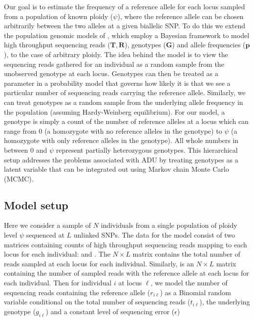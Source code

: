 \documentclass[11pt,english,letterpaper,oneside]{article}
\begin{document}
\noindent Our goal is to estimate the frequency of a reference allele for each locus sampled from a population of known ploidy ($\psi$), where the reference allele can be chosen arbitrarily between the two alleles at a given biallelic SNP. To do this we extend the population genomic models of \cite{buerkle2013popModels}, which employ a Bayesian framework to model high throughput sequencing reads ($\bm{T},\bm{R}$), genotypes ($\bm{G}$) and allele frequencies ($\bm{p}$), to the case of arbitrary ploidy. The idea behind the model is to view the sequencing reads gathered for an individual as a random sample from the unobserved genotype at each locus. Genotypes can then be treated as a parameter in a probability model that governs how likely it is that we see a particular number of sequencing reads carrying the reference allele. Similarly, we can treat genotypes as a random sample from the underlying allele frequency in the population (assuming Hardy-Weinberg equilibrium). For our model, a genotype is simply a count of the number of reference alleles at a locus which can range from 0 (a homozygote with no reference alleles in the genotype) to $\psi$ (a homozygote with only reference alleles in the genotype). All whole numbers in between 0 and $\psi$ represent partially heterozygous genotypes. This hierarchical setup addresses the problems associated with ADU by treating genotypes as a latent variable that can be integrated out using Markov chain Monte Carlo (MCMC).

\medskip
\subsection{Model setup} %
\medskip

Here we consider a sample of $N$ individuals from a single population of ploidy level $\psi$ sequenced at $L$ unlinked SNPs. The data for the model consist of two matrices containing counts of high throughput sequencing reads mapping to each locus for each individual: \rmat{} and \tmat. The $N \times L$ matrix \tmat{} contains the total number of reads sampled at each locus for each individual. Similarly, \rmat{} is an $N \times L$ matrix containing the number of sampled reads with the reference allele at each locus for each individual. Then for individual $i$ at locus $\ell$, we model the number of sequencing reads containing the reference allele ($r_{i\ell}$) as a Binomial random variable conditional on the total number of sequencing reads ($t_{i\ell} $), the underlying genotype ($g_{i\ell}$) and a constant level of sequencing error ($\epsilon$)
\end{document}

